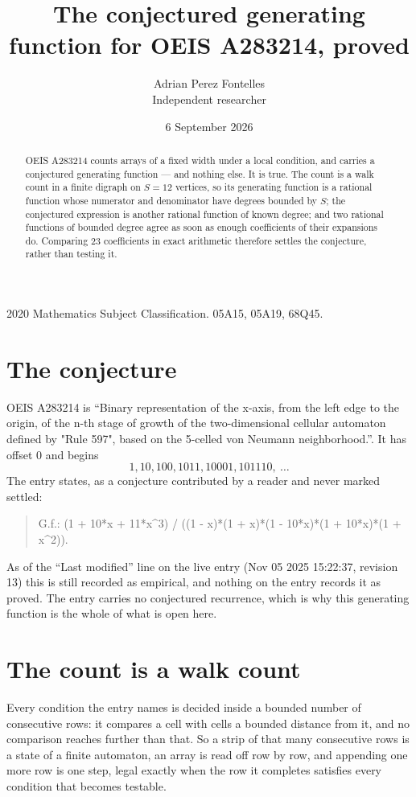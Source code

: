 \documentclass[11pt,a4paper]{article}
\title{The conjectured generating function for OEIS A283214, proved}
\author{Adrian Perez Fontelles\\ \small Independent researcher}
\date{6 September 2026}
\theoremstyle{plain}
\theoremstyle{definition}
\begin{document}
\maketitle

\begin{abstract}
OEIS A283214 counts arrays of a fixed width under a local condition, and carries a conjectured
generating function --- and nothing else. It is true. The count is a walk count in a finite
digraph on $S=12$ vertices, so its generating function is a rational function whose numerator
and denominator have degrees bounded by $S$; the conjectured expression is another rational
function of known degree; and two rational functions of bounded degree agree as soon as enough
coefficients of their expansions do. Comparing $23$ coefficients in exact arithmetic
therefore settles the conjecture, rather than testing it.
\end{abstract}

\noindent\small 2020 Mathematics Subject Classification. 05A15, 05A19, 68Q45.\normalsize

\section{The conjecture}

OEIS A283214 is ``Binary representation of the x-axis, from the left edge to the origin, of the n-th stage of growth of the two-dimensional cellular automaton defined by "Rule 597", based on the 5-celled von Neumann neighborhood.''. It has offset $0$ and begins
\[
1, 10, 100, 1011, 10001, 101110,\ \dots
\]
The entry states, as a conjecture contributed by a reader and never marked settled:
\begin{quote}
G.f.: (1 + 10*x + 11*x\^{}3) / ((1 - x)*(1 + x)*(1 - 10*x)*(1 + 10*x)*(1 + x\^{}2)).
\end{quote}
As of the ``Last modified'' line on the live entry (Nov 05 2025 15:22:37, revision 13) this is still
recorded as empirical, and nothing on the entry records it as proved. The entry carries no
conjectured recurrence, which is why this generating function is the whole of what is open
here.

\section{The count is a walk count}

Every condition the entry names is decided inside a bounded number of consecutive rows: it
compares a cell with cells a bounded distance from it, and no comparison reaches further than
that. So a strip of that many consecutive rows is a state of a finite automaton, an array is
read off row by row, and appending one more row is one step, legal exactly when the row it
completes satisfies every condition that becomes testable.
\end{document}
